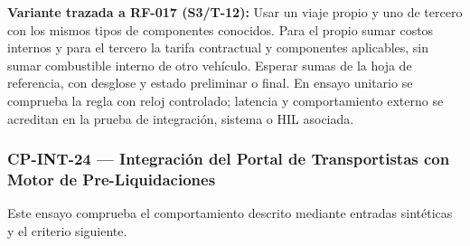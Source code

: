 \par\noindent\textbf{Variante trazada a RF-017 (S3/T-12):} Usar un viaje propio y uno de tercero con los mismos tipos de componentes conocidos. Para el propio sumar costos internos y para el tercero la tarifa contractual y componentes aplicables, sin sumar combustible interno de otro vehículo. Esperar sumas de la hoja de referencia, con desglose y estado preliminar o final. En ensayo unitario se comprueba la regla con reloj controlado; latencia y comportamiento externo se acreditan en la prueba de integración, sistema o HIL asociada.\par
\subsubsection*{CP-INT-24 — Integración del Portal de Transportistas con Motor de Pre-Liquidaciones}\label{sec:9-cp-int-24}
Este ensayo comprueba el comportamiento descrito mediante entradas sintéticas y el criterio siguiente.

